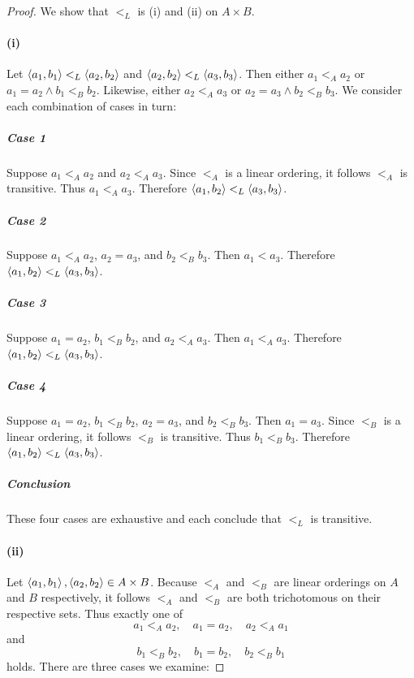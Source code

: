 \documentclass{report}
\begin{document}
  \begin{proof}

    We show that $<_L$ is (i)  and (ii)
       on $A \times B$.

    \paragraph{(i)}%

      Let $\left< a_1, b_1 \right> <_L \left< a_2, b_2 \right>$ and
        $\left< a_2, b_2 \right> <_L \left< a_3, b_3 \right>$.
      Then either $a_1 <_A a_2$ or $a_1 = a_2 \land b_1 <_B b_2$.
      Likewise, either $a_2 <_A a_3$ or $a_2 = a_3 \land b_2 <_B b_3$.
      We consider each combination of cases in turn:

      \subparagraph{Case 1}%

        Suppose $a_1 <_A a_2$ and $a_2 <_A a_3$.
        Since $<_A$ is a linear ordering, it follows $<_A$ is transitive.
        Thus $a_1 <_A a_3$.
        Therefore $\left< a_1, b_2 \right> <_L \left< a_3, b_3 \right>$.

      \subparagraph{Case 2}%

        Suppose $a_1 <_A a_2$, $a_2 = a_3$, and $b_2 <_B b_3$.
        Then $a_1 < a_3$.
        Therefore $\left< a_1, b_2 \right> <_L \left< a_3, b_3 \right>$.

      \subparagraph{Case 3}%

        Suppose $a_1 = a_2$, $b_1 <_B b_2$, and $a_2 <_A a_3$.
        Then $a_1 <_A a_3$.
        Therefore $\left< a_1, b_2 \right> <_L \left< a_3, b_3 \right>$.

      \subparagraph{Case 4}%

        Suppose $a_1 = a_2$, $b_1 <_B b_2$, $a_2 = a_3$, and $b_2 <_B b_3$.
        Then $a_1 = a_3$.
        Since $<_B$ is a linear ordering, it follows $<_B$ is transitive.
        Thus $b_1 <_B b_3$.
        Therefore $\left< a_1, b_2 \right> <_L \left< a_3, b_3 \right>$.

      \subparagraph{Conclusion}%

        These four cases are exhaustive and each conclude that $<_L$ is
          transitive.

    \paragraph{(ii)}%

      Let $\left< a_1, b_1 \right>, \left< a_2, b_2 \right> \in A \times B$.
      Because $<_A$ and $<_B$ are linear orderings on $A$ and $B$ respectively,
        it follows $<_A$ and $<_B$ are both trichotomous on their respective
        sets.
      Thus exactly one of $$a_1 <_A a_2, \quad a_1 = a_2, \quad a_2 <_A a_1$$
        and $$b_1 <_B b_2, \quad b_1 = b_2, \quad b_2 <_B b_1$$ holds.
      There are three cases we examine:


\end{proof}
\end{document}

